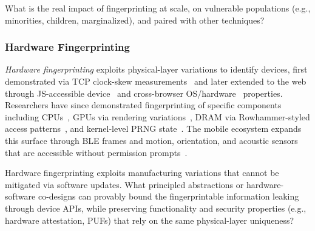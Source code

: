 \begin{opbox}
What is the real impact of fingerprinting at scale, on vulnerable populations (e.g., minorities, children, marginalized), and paired with other techniques?
\end{opbox}


\subsubsection{Hardware Fingerprinting} 
\label{sec:stateless-techniques-hardware-fingperinting}

\textit{Hardware fingerprinting} exploits physical-layer variations to identify devices, first demonstrated via TCP clock-skew measurements~\cite{kohnoRemotePhysicalDevice2005} and later extended to the web through JS-accessible device~\cite{nikiforakisCookielessMonsterExploring2013} and cross-browser OS/hardware~\cite{caoCrossBrowserFingerprintingOS2017} properties.
%
Researchers have since demonstrated fingerprinting of specific components including CPUs~\cite{trampertBrowserBasedCPUFingerprinting2022,sanchez-rolaClockClockTimeBased2018}, GPUs via rendering variations~\cite{laorDRAWNAPARTDevice2022}, DRAM via Rowhammer-styled access patterns~\cite{venugopalanFPRowhammerDRAMBasedDevice2024}, and kernel-level PRNG state~\cite{kleinCrossLayerAttacks2021,kol2023device}.
%
The mobile ecosystem expands this surface through BLE frames \cite{martinHandoffAllYour2019} and motion, orientation, and acoustic sensors that are accessible without permission prompts~\cite{zhouAcousticFingerprintingRevisited2014,zhang2019sensorid,dasWebsSixthSense2018}.
%

\begin{opbox}
Hardware fingerprinting exploits manufacturing variations that cannot be mitigated via software updates. What principled abstractions or hardware-software co-designs can provably bound the fingerprintable information leaking through device APIs, while preserving functionality and security properties (e.g., hardware attestation, PUFs) that rely on the same physical-layer uniqueness?
\end{opbox}


